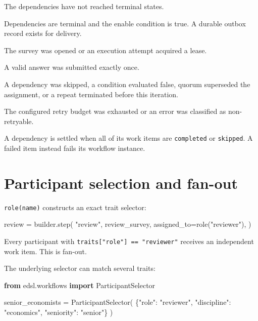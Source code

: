 \documentclass[
  10pt,
]{report}
\newenvironment{Shaded}{}{}
\newcommand{\ImportTok}[1]{\textcolor[rgb]{0.00,0.50,0.00}{\textbf{#1}}}
\newcommand{\NormalTok}[1]{#1}
\newcommand{\OperatorTok}[1]{\textcolor[rgb]{0.40,0.40,0.40}{#1}}
\newcommand{\StringTok}[1]{\textcolor[rgb]{0.25,0.44,0.63}{#1}}
\providecommand{\tightlist}{%
  \setlength{\itemsep}{0pt}\setlength{\parskip}{0pt}}
\begin{document}
\begin{description}
\tightlist
\item[\texttt{blocked}]
The dependencies have not reached terminal states.
\item[\texttt{ready}]
Dependencies are terminal and the enable condition is true. A durable
outbox record exists for delivery.
\item[\texttt{in\_progress}]
The survey was opened or an execution attempt acquired a lease.
\item[\texttt{completed}]
A valid answer was submitted exactly once.
\item[\texttt{skipped}]
A dependency was skipped, a condition evaluated false, quorum superseded
the assignment, or a repeat terminated before this iteration.
\item[\texttt{failed}]
The configured retry budget was exhausted or an error was classified as
non-retryable.
\end{description}

A dependency is settled when all of its work items are
\texttt{completed} or \texttt{skipped}. A failed item instead fails its
workflow instance.

\chapter{Participant selection and
fan-out}\label{participant-selection-and-fan-out}

\texttt{role(name)} constructs an exact trait selector:

\begin{Shaded}
\begin{Highlighting}[]
\NormalTok{review }\OperatorTok{=}\NormalTok{ builder.step(}
    \StringTok{"review"}\NormalTok{,}
\NormalTok{    review\_survey,}
\NormalTok{    assigned\_to}\OperatorTok{=}\NormalTok{role(}\StringTok{"reviewer"}\NormalTok{),}
\NormalTok{)}
\end{Highlighting}
\end{Shaded}

Every participant with \texttt{traits{[}"role"{]}\ ==\ "reviewer"}
receives an independent work item. This is fan-out.

The underlying selector can match several traits:

\begin{Shaded}
\begin{Highlighting}[]
\ImportTok{from}\NormalTok{ edsl.workflows }\ImportTok{import}\NormalTok{ ParticipantSelector}

\NormalTok{senior\_economists }\OperatorTok{=}\NormalTok{ ParticipantSelector(}
\NormalTok{    \{}\StringTok{"role"}\NormalTok{: }\StringTok{"reviewer"}\NormalTok{, }\StringTok{"discipline"}\NormalTok{: }\StringTok{"economics"}\NormalTok{, }\StringTok{"seniority"}\NormalTok{: }\StringTok{"senior"}\NormalTok{\}}
\NormalTok{)}
\end{Highlighting}
\end{Shaded}
\end{document}
